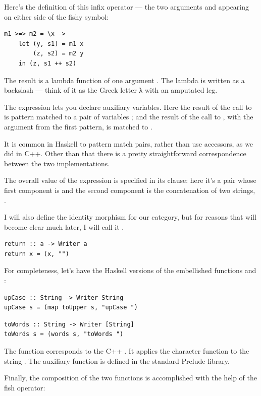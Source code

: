 Here's the definition of this infix operator --- the two arguments
 and  appearing on either side of the fishy
symbol:

\begin{Verbatim}
m1 >=> m2 = \x ->
    let (y, s1) = m1 x
        (z, s2) = m2 y
    in (z, s1 ++ s2)
\end{Verbatim}
The result is a lambda function of one argument . The lambda
is written as a backslash --- think of it as the Greek letter λ with an
amputated leg.

The  expression lets you declare auxiliary variables. Here
the result of the call to  is pattern matched to a pair of
variables ; and the result of the call to ,
with the argument  from the first pattern, is matched to
.

It is common in Haskell to pattern match pairs, rather than use
accessors, as we did in C++. Other than that there is a pretty
straightforward correspondence between the two implementations.

The overall value of the  expression is specified in its
 clause: here it's a pair whose first component is 
and the second component is the concatenation of two strings,
.

I will also define the identity morphism for our category, but for
reasons that will become clear much later, I will call it
.

\begin{Verbatim}
return :: a -> Writer a
return x = (x, "")
\end{Verbatim}
For completeness, let's have the Haskell versions of the embellished
functions  and :

\begin{Verbatim}
upCase :: String -> Writer String
upCase s = (map toUpper s, "upCase ")
\end{Verbatim}

\begin{Verbatim}
toWords :: String -> Writer [String]
toWords s = (words s, "toWords ")
\end{Verbatim}
The function  corresponds to the C++ . It
applies the character function  to the string
. The auxiliary function  is defined in the
standard Prelude library.

Finally, the composition of the two functions is accomplished with the
help of the fish operator:

